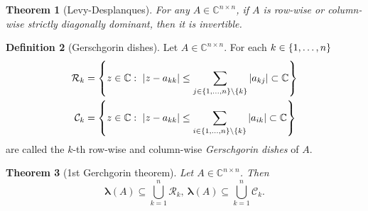 \documentclass[12pt]{article}
\newcounter{lecture}
\newtheorem{theorem}{Theorem}[lecture]
\theoremstyle{definition}
\newtheorem{definition}[theorem]{Definition}
\theoremstyle{remark}
\numberwithin{equation}{section}
\newcommand{\C}{\mathbb{C}}
\newcommand{\spectrum}[1]{\bm{\lambda}(#1)}
\DeclarePairedDelimiter{\set}{\{}{\}}
\begin{document}
\begin{theorem}[Levy-Desplanques]
  For any $A \in \C^{n \times n}$, if $A$ is row-wise or column-wise strictly diagonally dominant, then it is invertible.
\end{theorem}

\begin{definition}[Gerschgorin dishes]
  Let $A \in \C^{n \times n}$. For each $k \in \set{1,\ldots, n}$
  \begin{align*}
    \mathcal{R}_k &= \set*{z \in \C:\ |z-a_{kk}| \leq \sum_{j \in \set{1,\ldots,n} \setminus \set{k}} |a_{kj}|\subset \C} \\
    \mathcal{C}_k &= \set*{z \in \C:\ |z-a_{kk}| \leq \sum_{i \in \set{1,\ldots,n} \setminus \set{k}} |a_{ik}|\subset \C}
  \end{align*}
  are called the $k$-th row-wise and column-wise \emph{Gerschgorin dishes} of $A$.
\end{definition}

\begin{theorem}[1st Gerchgorin theorem]
  Let $A \in \C^{n \times n}$. Then
  \begin{equation*}
    \spectrum{A} \subseteq \bigcup_{k=1}^n \mathcal{R}_k,\ \spectrum{A}\subseteq\bigcup_{k=1}^n \mathcal{C}_k.
  \end{equation*}
\end{theorem}
\end{document}
